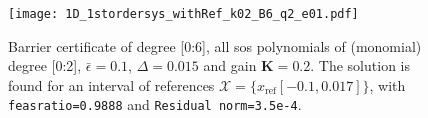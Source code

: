 








\begin{figure}[H]
\centering
\texttt{[image: 1D\_1stordersys\_withRef\_k02\_B6\_q2\_e01.pdf]}
\caption{Barrier certificate of degree [0:6], all \gls{sos} polynomials of (monomial) degree [0:2], $\bar{\epsilon}=0.1$, $\Delta=0.015$ and gain $\textbf{K}=0.2$. The solution is found for an interval of references $\mathcal{X}=\{x_\text{ref}[-0.1,0.017] \}$, with \texttt{feasratio=0.9888} and \texttt{Residual norm=3.5e-4}.}
\label{fig:1D_1stordersys_withRef_k02_B6_q2_e01}
\end{figure}

